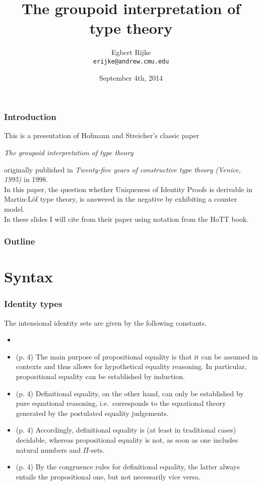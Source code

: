 \documentclass[handout]{beamer}
\title{The groupoid interpretation of type theory}
\author[Egbert]{Egbert Rijke \\ \texttt{erijke@andrew.cmu.edu}}
\date{September 4th, 2014}
\institute{Carnegie Mellon University}
\begin{document}
\begin{frame}
  \titlepage
\end{frame}

\begin{frame}
  \frametitle{Introduction}
  This is a presentation of Hofmann and Streicher's classic paper
  \begin{center}
  \emph{The groupoid interpretation of type theory}
  \end{center}
  originally published in
  \emph{Twenty-five years of constructive type theory (Venice, 1995)}
  in 1998.
  \\
  \vspace{\baselineskip}
  In this paper, the question whether Uniqueness of Identity Proofs is derivable
  in Martin-L\"of type theory, is answered in the negative by exhibiting a
  counter model.
  \\
  \vspace{\baselineskip}
  In these slides I will cite from their paper using notation from the
  HoTT book.
\end{frame}

\begin{frame}
  \frametitle{Outline}
  \tableofcontents[pausesections]
\end{frame}

\section{Syntax}

\begin{frame}
  \frametitle{Identity types}
The intensional identity sets are given by the following constants.
\begin{itemize}
\item  
\end{itemize}
\end{frame}

\begin{frame}
\begin{itemize}
\item<1-> (p. 4) The main purpose of propositional equality is that it can be 
  assumed in contexts and thus allows for hypothetical equality reasoning. In 
  particular, propositional equality can be established by induction.
\item<2-> (p. 4) Definitional equality, on the other hand, can only be 
  established by pure equational reasoning, i.e.~corresponds to the equational
  theory generated by the postulated equality judgements.
\item<3-> (p. 4) Accordingly, definitional equality is (at least in traditional
  cases) decidable, whereas propositional equality is not, as soon as one 
  includes natural numbers and $\Pi$-sets.
\item<4-> (p. 4) By the congruence rules for definitional equality, the latter
  always entails the propositional one, but not necessarily vice versa.
\end{itemize}
\end{frame}
\end{document}
